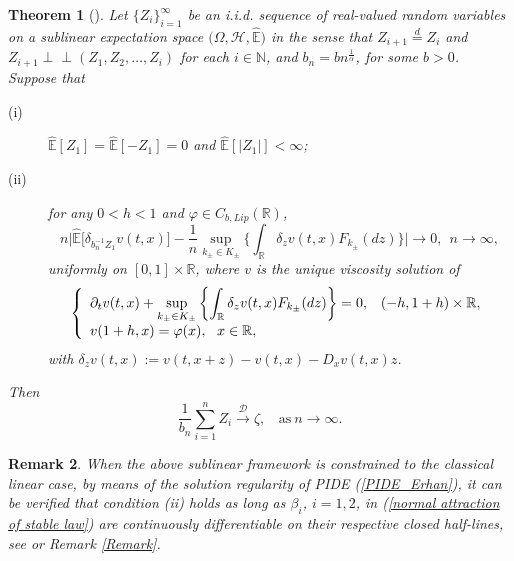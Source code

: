 \documentclass[a4paper,oneside,10pt]{article}%
\newtheorem{theorem}{Theorem}[section]
\newtheorem{remark}[theorem]{Remark}
\numberwithin{equation}{section}
\begin{document}
\begin{theorem}
[\cite{BM2016}]\label{Theorem_Erhan} Let $\{Z_{i}\}_{i=1}^{\infty}$ be an
i.i.d. sequence of real-valued random variables on a sublinear expectation
space $(\Omega,\mathcal{H},\mathbb{\hat{E})}$ in the sense that $Z_{i+1}%
\overset{d}{=}Z_{i}$ and $Z_{i+1}\perp \! \! \! \perp(Z_{1},Z_{2},\ldots
,Z_{i})$ for each $i\in \mathbb{N}$, and $b_{n}=bn^{\frac{1}{\alpha}}$, for
some $b>0$. Suppose that

\begin{description}
\item[(i)] $\mathbb{\hat{E}}[Z_{1}]=\mathbb{\hat{E}}[-Z_{1}]=0$ and
$\mathbb{\hat{E}}[|Z_{1}|]<\infty$;

\item[(ii)] for any $0<h<1$ and $\varphi \in C_{b,Lip}(\mathbb{R})$,
\[
n\bigg \vert \mathbb{\hat{E}}\big[\delta_{b_{n}^{-1}Z_{1}}v(t,x)\big]-\frac
{1}{n}\sup \limits_{k_{\pm}\in K_{\pm}}\bigg \{ \int_{\mathbb{R}}\delta
_{z}v(t,x)F_{k_{\pm}}(dz)\bigg \} \bigg \vert \rightarrow0,\  \ n\rightarrow
\infty,
\]
uniformly on $[0,1]\times \mathbb{R}$, where $v$ is the unique viscosity
solution of
\begin{equation}
\left \{
\begin{array}
[c]{ll}%
\displaystyle \partial_{t}v(t,x)+\sup \limits_{k_{\pm}\in K_{\pm}}\left \{
\int_{\mathbb{R}}\delta_{z}v(t,x)F_{k_{\pm}}(dz)\right \}  =0, & (-h,1+h)\times
\mathbb{R},\\
\displaystyle v(1+h,x)=\varphi(x),\text{ \ }x\in \mathbb{R}, &
\end{array}
\right.  \label{PIDE_Erhan}%
\end{equation}
with $\delta_{z}v(t,x):=v(t,x+z)-v(t,x)-D_{x}v(t,x)z$.
\end{description}

Then
\[
\frac{1}{b_{n}}\sum_{i=1}^{n}Z_{i}\overset{\mathcal{D}}{\rightarrow}%
\zeta,\  \  \  \  \text{as}\ n\rightarrow \infty.
\]

\end{theorem}

\begin{remark}
When the above sublinear framework is constrained to the classical linear
case, by means of the solution regularity of PIDE (\ref{PIDE_Erhan}), it can
be verified that condition (ii) holds as long as $\beta_{i}$, $i=1,2$, in
(\ref{normal attraction of stable law}) are continuously differentiable on
their respective closed half-lines, see \cite{BM2016} or Remark \ref{Remark}.
\end{remark}
\end{document}
